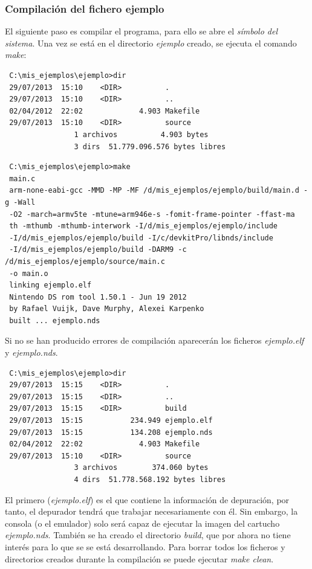 \subsubsection{Compilación del fichero ejemplo}
El siguiente paso es compilar el programa, para ello se abre el \textit{símbolo del sistema}. Una vez se está en el directorio \textit{ejemplo} creado, se ejecuta el comando \textit{make}:

{\scriptsize
\begin{verbatim}
 C:\mis_ejemplos\ejemplo>dir
 29/07/2013  15:10    <DIR>          .
 29/07/2013  15:10    <DIR>          ..
 02/04/2012  22:02             4.903 Makefile
 29/07/2013  15:10    <DIR>          source
                1 archivos          4.903 bytes
                3 dirs  51.779.096.576 bytes libres
 \end{verbatim}
}

{\scriptsize
\begin{verbatim}
 C:\mis_ejemplos\ejemplo>make
 main.c
 arm-none-eabi-gcc -MMD -MP -MF /d/mis_ejemplos/ejemplo/build/main.d -g -Wall 
 -O2 -march=armv5te -mtune=arm946e-s -fomit-frame-pointer -ffast-ma
 th -mthumb -mthumb-interwork -I/d/mis_ejemplos/ejemplo/include
 -I/d/mis_ejemplos/ejemplo/build -I/c/devkitPro/libnds/include 
 -I/d/mis_ejemplos/ejemplo/build -DARM9 -c /d/mis_ejemplos/ejemplo/source/main.c 
 -o main.o
 linking ejemplo.elf
 Nintendo DS rom tool 1.50.1 - Jun 19 2012
 by Rafael Vuijk, Dave Murphy, Alexei Karpenko
 built ... ejemplo.nds
\end{verbatim}
}

Si no se han producido errores de compilación aparecerán los ficheros  \textit{ejemplo.elf} y \textit{ejemplo.nds}.

{\scriptsize
 \begin{verbatim}
 C:\mis_ejemplos\ejemplo>dir
 29/07/2013  15:15    <DIR>          .
 29/07/2013  15:15    <DIR>          ..
 29/07/2013  15:15    <DIR>          build
 29/07/2013  15:15           234.949 ejemplo.elf
 29/07/2013  15:15           134.208 ejemplo.nds
 02/04/2012  22:02             4.903 Makefile
 29/07/2013  15:10    <DIR>          source
                3 archivos        374.060 bytes
                4 dirs  51.778.568.192 bytes libres
 \end{verbatim}
}

El primero (\textit{ejemplo.elf}) es el que contiene la información de depuración, por tanto, el depurador tendrá que trabajar necesariamente con él. Sin embargo,  la consola (o el emulador) solo será capaz de ejecutar la imagen del cartucho \textit{ejemplo.nds}. También se ha creado el directorio \textit{build}, que por ahora no tiene interés para lo que se  se está desarrollando. Para borrar todos los ficheros y directorios creados durante la compilación se puede ejecutar \textit{make clean}.


